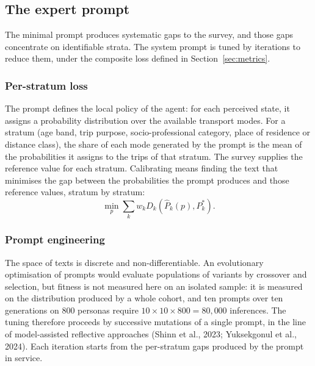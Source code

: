
\subsection{The expert prompt}
\label{sec:expert-prompt}

The minimal prompt produces systematic gaps to the survey, and those gaps concentrate on identifiable strata. The system prompt is tuned by iterations to reduce them, under the composite loss defined in Section~\ref{sec:metrics}.

\subsubsection{Per-stratum loss}

The prompt defines the local policy of the agent: for each perceived state, it assigns a probability distribution over the available transport modes. For a stratum (age band, trip purpose, socio-professional category, place of residence or distance class), the share of each mode generated by the prompt is the mean of the probabilities it assigns to the trips of that stratum. The survey supplies the reference value for each stratum. Calibrating means finding the text that minimises the gap between the probabilities the prompt produces and those reference values, stratum by stratum:
\[
  \min_p \sum_k w_k D_k(\hat{P}_k(p), P^{*}_{k}).
\]

\subsubsection{Prompt engineering}

The space of texts is discrete and non-differentiable. An evolutionary optimisation of prompts \citep{guo2023evoprompt} would evaluate populations of variants by crossover and selection, but fitness is not measured here on an isolated sample: it is measured on the distribution produced by a whole cohort, and ten prompts over ten generations on 800 personas require $10 \times 10 \times 800 = 80{,}000$ inferences. The tuning therefore proceeds by successive mutations of a single prompt, in the line of model-assisted reflective approaches (Shinn et al., 2023; Yuksekgonul et al., 2024). Each iteration starts from the per-stratum gaps produced by the prompt in service.

